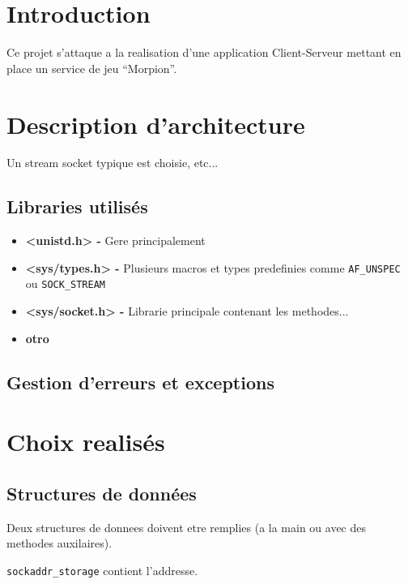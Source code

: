 \documentclass[11pt,a4paper]{article}
\begin{document}
\pagestyle{fancy}

\section{Introduction}
\label{sec:intro}

Ce projet s'attaque a la realisation d'une application Client-Serveur
mettant en place un service de jeu ``Morpion''.

\section{Description d'architecture}
\label{sec:des}

Un stream socket typique est choisie, etc...

\subsection{Libraries utilisés}
\label{sec:lib}

\begin{itemize}
\item \textbf{<unistd.h> - }Gere principalement
\item \textbf{<sys/types.h> - }Plusieurs macros et types predefinies
  comme \texttt{AF\_UNSPEC} ou \texttt{SOCK\_STREAM}
\item \textbf{<sys/socket.h> - }Librarie principale contenant les
  methodes...
\item \textbf{otro}
\end{itemize}

\subsection{Gestion d'erreurs et exceptions}
\label{sec:err}



\section{Choix realisés}
\label{sec:choix}

\subsection{Structures de données}
\label{sec:struct}

Deux structures de donnees doivent etre remplies (a la main ou avec
des methodes auxilaires).

\texttt{sockaddr\_storage} contient l'addresse.
\end{document}
